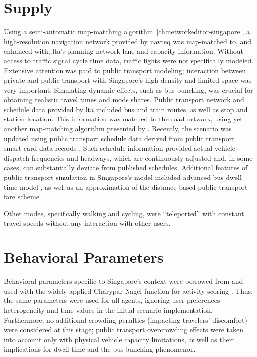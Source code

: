 \section{Supply}
Using a semi-automatic map-matching algorithm~\ref{ch:networkeditor-singapore}, a high-resolution navigation network provided by \gls{navteq} was map-matched to, and enhanced with, \gls{lta}'s planning network lane and capacity information. Without access to traffic signal cycle time data, traffic lights were not specifically modeled. Extensive attention was paid to public transport modeling; interaction between private and public transport with Singapore’s high density and limited space was very important. Simulating dynamic effects, such as bus bunching, was crucial for obtaining realistic travel times and mode shares. Public transport network and schedule data provided by \gls{lta} included bus and train routes, as well as stop and station location. This information was matched to the road network, using yet another map-matching algorithm presented by \citet[][]{Ordonez_HKSTS_2011, Ordonez_Webpage_2011_4}. Recently, the scenario was updated using public transport schedule data derived from public transport smart card data records \citet[][]{Fourie_TechRep_FCL_2014}. Such schedule information provided actual vehicle dispatch frequencies and headways, which are continuously adjusted and, in some cases, can substantially deviate from published schedules. Additional features of public transport simulation in Singapore’s model included advanced bus dwell time model \citep[][]{SunEtAl_TransResA_2014}, as well as an approximation of the distance-based public transport fare scheme.

Other modes, specifically walking and cycling, were ``\gls{teleported}'' with constant travel speeds without any interaction with other users. 

\section{Behavioral Parameters}
Behavioral parameters specific to Singapore's context were borrowed from \citet[][]{LTA_unpub_2009} and used with the widely applied Charypar-Nagel function for activity scoring \citet[][]{CharyparNagel2005ga4acts}. Thus, the same parameters were used for all agents, ignoring user preferences heterogeneity and time values in the initial scenario implementation. Furthermore, no additional crowding penalties (impacting travelers' discomfort) were considered at this stage; public transport overcrowding effects were taken into account only with physical vehicle capacity limitations, as well as their implications for dwell time and the bus bunching phenomenon. 

